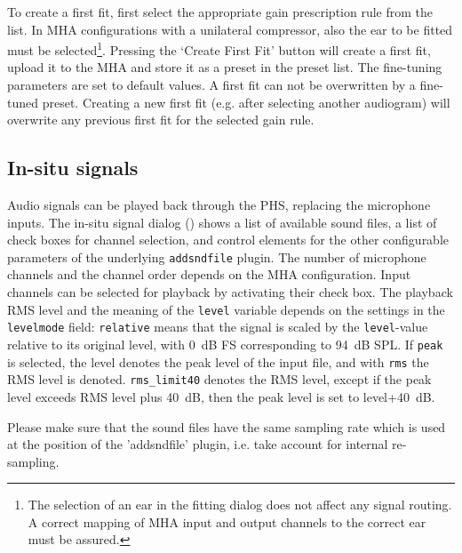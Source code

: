 \documentclass[11pt,a4paper,twoside]{article}
\newcommand{\+}{\discretionary{\mbox{\scriptsize$\hookleftarrow$}}{}{}}
\begin{document}
To create a first fit, first select the appropriate gain prescription
rule from the list. In MHA configurations with a unilateral
compressor, also the ear to be fitted must be selected\footnote{The
  selection of an ear in the fitting dialog does not affect any signal
  routing. A correct mapping of MHA input and output channels to the
  correct ear must be assured.}. Pressing the `Create First Fit'
button will create a first fit, upload it to the MHA and store it as a
preset in the preset list. The fine-tuning parameters are set to
default values.  A first fit can not be overwritten by a fine-tuned
preset.  Creating a new first fit (e.g. after selecting another
audiogram) will overwrite any previous first fit for the selected gain
rule.


\subsection{In-situ signals}\label{sec:insitu}

Audio signals can be played back through the PHS, replacing the
microphone inputs.
%
The in-situ signal dialog ()
shows a list of available sound files, a list of check boxes for
channel selection, and control elements for the other configurable
parameters of the underlying \verb!addsndfile! plugin.
%
The number of microphone channels and the channel order depends on the MHA
configuration.
%
Input channels can be selected for playback by activating their check
box.
%
The playback RMS level and the meaning of the \verb!level! variable
depends on the settings in the \verb!levelmode!  field:
\verb!relative! means that the signal is scaled by the
\verb!level!-value relative to its original level, with 0~dB FS
corresponding to 94~dB SPL. If \verb!peak! is selected, the level
denotes the peak level of the input file, and with \verb!rms! the RMS
level is denoted. \verb!rms_limit40! denotes the RMS level, except if
the peak level exceeds RMS level plus 40~dB, then the peak level is
set to level+40~dB.

Please make sure that the sound files have the same sampling rate
which is used at the position of the 'addsndfile' plugin, i.e. take
account for internal re-sampling.

\end{document}
